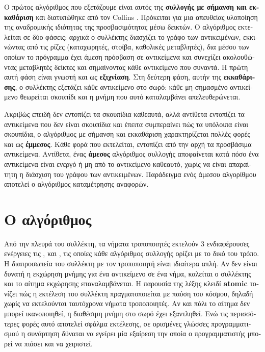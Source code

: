 \begin{greek}
Ο πρώτος αλγόριθμος που εξετάζουμε είναι αυτός της 
\textbf{συλλογής με σήμανση και εκκαθάριση} και διατυπώθηκε από
τον Collins \cite{DBLP:journals/cacm/McCarthy60}. Πρόκειται για
μια απευθείας υλοποίηση της αναδρομικής ιδιότητας της προσβασιμότητας
μέσω δεικτών. Ο αλγόριθμος εκτελείται σε δύο φάσεις: αρχικά ο
συλλέκτης διασχίζει το γράφο των αντικειμένων, εκκινώντας από
τις ρίζες (καταχωρητές, στοίβα, καθολικές μεταβλητές), δια μέσου
των οποίων το πρόγραμμα έχει άμεση πρόσβαση σε αντικείμενα
και συνεχίζει ακολουθώντας μεταβλητές δείκτες και σημαίνοντας
κάθε αντικείμενο που συναντά. Η πρώτη αυτή φάση είναι γνωστή και
ως \textbf{εξιχνίαση}. Στη δεύτερη φάση, αυτήν της \textbf{εκκαθάρισης},
ο συλλέκτης εξετάζει κάθε αντικείμενο στο σωρό: κάθε μη-σημασμένο
αντικείμενο θεωρείται σκουπίδι και η μνήμη που αυτό καταλαμβάνει
απελευθερώνεται.

Ακριβώς επειδή δεν εντοπίζει τα σκουπίδια καθεαυτά, αλλά αντίθετα 
εντοπίζει τα αντικείμενα που δεν είναι σκουπίδια και έπειτα 
συμπεραίνει πώς τα υπόλοιπα είναι σκουπίδια, ο αλγόριθμος με 
σήμανση και εκκαθάριση χαρακτηρίζεται πολλές φορές και ως
\textbf{έμμεσος}. Κάθε φορά που εκτελείται, εντοπίζει 
από την αρχή τα προσβάσιμα αντικείμενα. Αντίθετα, ένας 
\textbf{άμεσος} αλγόριθμος συλλογής αποφαίνεται κατά 
πόσο ένα αντικείμενα είναι ενεργό ή μη από το αντικείμενο καθεαυτό, 
χωρίς να είναι απαραίτητη η διάσχιση του γράφου των αντικειμένων. 
Παράδειγμα ενός άμεσου αλγορίθμου αποτελεί ο αλγόριθμος 
καταμέτρησης αναφορών.

\section{Ο αλγόριθμος}
Από την πλευρά του συλλέκτη, τα νήματα τροποποιητές εκτελούν 3 
ενδιαφέρουσες ενέργειες τις \textenglish{}, \textenglish{} και
\textenglish{}, τις οποίες κάθε αλγόριθμος συλλογής ορίζει
με το δικό του τρόπο. Η διαπροσωπεία του συλλέκτη με τον τροποποιητή
είναι ιδιαίτερα απλή. Αν δεν είναι δυνατή η εκχώρηση μνήμης για 
ένα αντικείμενο σε ένα νήμα, καλείται ο συλλέκτης και το αίτημα 
εκχώρησης επαναλαμβάνεται. Η παρουσία της λέξης κλειδί 
\textbf{atomic} τονίζει πώς η εκτέλεση του συλλέκτη πραγματοποιείται
με παύση του κόσμου, δηλαδή χωρίς να εκτελούνται ταυτόχρονα νήματα
τροποποιητές. Αν και πάλι το αίτημα δεν μπορεί ικανοποιηθεί, η
διαθέσιμη μνήμη στο σωρό έχει εξαντληθεί. Ενώ τις περισσότερες 
φορές αυτό αποτελεί σφάλμα εκτέλεσης, σε ορισμένες γλώσσες
προγραμματισμού η συνάρτηση \textenglish{} δύναται να εγείρει
μία εξαίρεση την οποία ο προγραμματιστής μπορεί να πιάσει και
να χειριστεί.


\end{greek}
